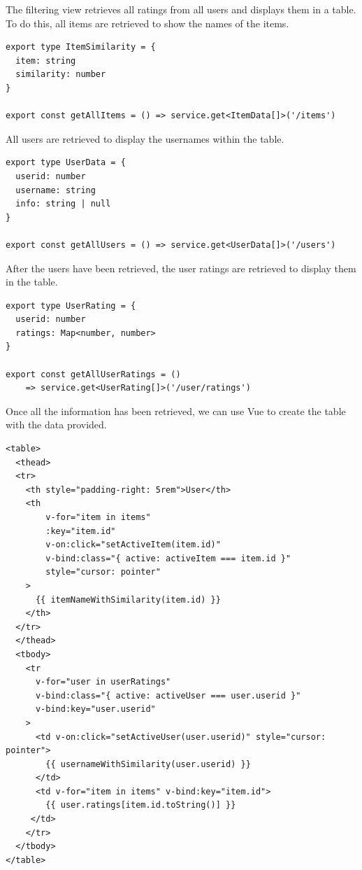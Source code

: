 The filtering view retrieves all ratings from all users and displays them in a table. To do this, all items are retrieved to show the names of the items.

\begin{verbatim}
export type ItemSimilarity = {
  item: string
  similarity: number
}

export const getAllItems = () => service.get<ItemData[]>('/items')
\end{verbatim}

All users are retrieved to display the usernames within the table.

\begin{verbatim}
export type UserData = {
  userid: number
  username: string
  info: string | null
}

export const getAllUsers = () => service.get<UserData[]>('/users')
\end{verbatim}

After the users have been retrieved, the user ratings are retrieved to display them in the table.

\begin{verbatim}
export type UserRating = {
  userid: number
  ratings: Map<number, number>
}

export const getAllUserRatings = () 
    => service.get<UserRating[]>('/user/ratings')
\end{verbatim}

Once all the information has been retrieved, we can use Vue to create the table with the data provided.

\begin{verbatim}
<table>
  <thead>
  <tr>
    <th style="padding-right: 5rem">User</th>
    <th
        v-for="item in items"
        :key="item.id"
        v-on:click="setActiveItem(item.id)"
        v-bind:class="{ active: activeItem === item.id }"
        style="cursor: pointer"
    >
      {{ itemNameWithSimilarity(item.id) }}
    </th>
  </tr>
  </thead>
  <tbody>
    <tr
      v-for="user in userRatings"
      v-bind:class="{ active: activeUser === user.userid }"
      v-bind:key="user.userid"
    >
      <td v-on:click="setActiveUser(user.userid)" style="cursor: pointer">
        {{ usernameWithSimilarity(user.userid) }}
      </td>
      <td v-for="item in items" v-bind:key="item.id">
        {{ user.ratings[item.id.toString()] }}
     </td>
    </tr>
  </tbody>
</table>
\end{verbatim}

